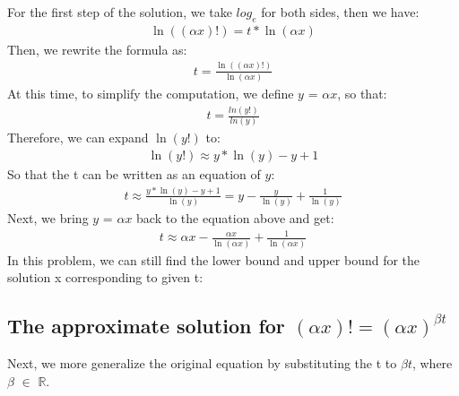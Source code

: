 \documentclass{article}
\begin{document}
        For the first step of the solution, we take $log_e$ for both sides, then we have:
            \begin{align*}
                \ln((\alpha x)!) = t * \ln(\alpha x)
            \end{align*}
        Then, we rewrite the formula as:
             \begin{align*}
                t = \frac{\ln((\alpha x)!)}{\ln(\alpha x)}
            \end{align*}
        At this time, to simplify the computation, we define $y$ = $\alpha x$, so that:
            \begin{align*}
                t = \frac{ln(y!)}{ln(y)}
            \end{align*}
        Therefore, we can expand $\ln(y!)$ to:
            \begin{align*}
               \ln(y!) \approx y * \ln(y) - y + 1
            \end{align*}
        So that the t can be written as an equation of $y$:
            \begin{align*}
               t \approx \frac{y * \ln(y) - y + 1}{\ln(y)} = y - \frac{y}{\ln(y)} + \frac{1}{\ln(y)}
            \end{align*}
        Next, we bring $y$ = $\alpha x$ back to the equation above and get:
            \begin{align*}
               t \approx \alpha x - \frac{\alpha x}{\ln(\alpha x)} + \frac{1}{\ln(\alpha x)}
            \end{align*}
        In this problem, we can still find the lower bound and upper bound for the solution x corresponding to given t:\\
        \subsection{The approximate solution for $(\alpha x)! = (\alpha x) ^ {\beta t}$}
        Next, we more generalize the original equation by substituting the t to $\beta t$, where $\beta$ $\in$ $\mathbb{R}$. 
\end{document}
